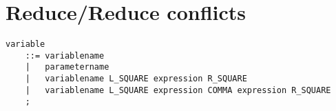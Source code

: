 \documentclass[oneside]{amsart}
\theoremstyle{definition}
\theoremstyle{remark}
\numberwithin{equation}{section}
\begin{document}
\section{Reduce/Reduce conflicts}
\begin{lstlisting}
variable
    ::= variablename
    |   parametername
    |   variablename L_SQUARE expression R_SQUARE
    |   variablename L_SQUARE expression COMMA expression R_SQUARE
    ;
\end{lstlisting}

\end{document}
